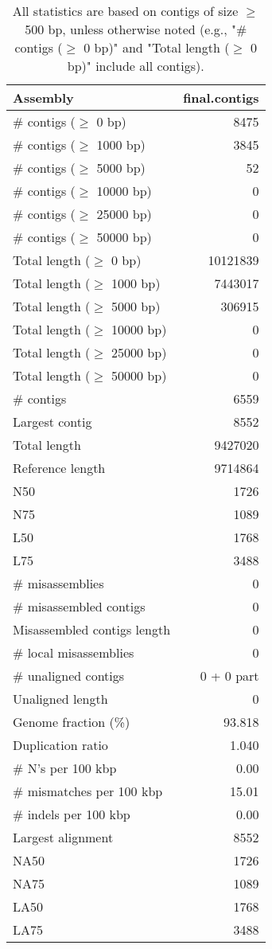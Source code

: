 \documentclass[12pt,a4paper]{article}
\begin{document}
\begin{table}[ht]
\begin{center}
\caption{All statistics are based on contigs of size $\geq$ 500 bp, unless otherwise noted (e.g., "\# contigs ($\geq$ 0 bp)" and "Total length ($\geq$ 0 bp)" include all contigs).}
\begin{tabular}{|l*{1}{|r}|}
\hline
Assembly & final.contigs \\ \hline
\# contigs ($\geq$ 0 bp) & 8475 \\ \hline
\# contigs ($\geq$ 1000 bp) & 3845 \\ \hline
\# contigs ($\geq$ 5000 bp) & 52 \\ \hline
\# contigs ($\geq$ 10000 bp) & 0 \\ \hline
\# contigs ($\geq$ 25000 bp) & 0 \\ \hline
\# contigs ($\geq$ 50000 bp) & 0 \\ \hline
Total length ($\geq$ 0 bp) & 10121839 \\ \hline
Total length ($\geq$ 1000 bp) & 7443017 \\ \hline
Total length ($\geq$ 5000 bp) & 306915 \\ \hline
Total length ($\geq$ 10000 bp) & 0 \\ \hline
Total length ($\geq$ 25000 bp) & 0 \\ \hline
Total length ($\geq$ 50000 bp) & 0 \\ \hline
\# contigs & 6559 \\ \hline
Largest contig & 8552 \\ \hline
Total length & 9427020 \\ \hline
Reference length & 9714864 \\ \hline
N50 & 1726 \\ \hline
N75 & 1089 \\ \hline
L50 & 1768 \\ \hline
L75 & 3488 \\ \hline
\# misassemblies & 0 \\ \hline
\# misassembled contigs & 0 \\ \hline
Misassembled contigs length & 0 \\ \hline
\# local misassemblies & 0 \\ \hline
\# unaligned contigs & 0 + 0 part \\ \hline
Unaligned length & 0 \\ \hline
Genome fraction (\%) & 93.818 \\ \hline
Duplication ratio & 1.040 \\ \hline
\# N's per 100 kbp & 0.00 \\ \hline
\# mismatches per 100 kbp & 15.01 \\ \hline
\# indels per 100 kbp & 0.00 \\ \hline
Largest alignment & 8552 \\ \hline
NA50 & 1726 \\ \hline
NA75 & 1089 \\ \hline
LA50 & 1768 \\ \hline
LA75 & 3488 \\ \hline
\end{tabular}
\end{center}
\end{table}
\end{document}
